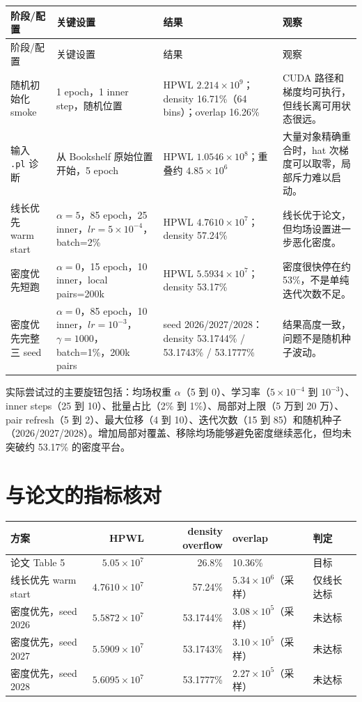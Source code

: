 \documentclass[11pt,a4paper]{ctexart}
\newcommand{\HPWL}{\textsc{HPWL}}
\begin{document}
\begin{longtable}{p{2.7cm}p{4.2cm}p{4.0cm}p{3.2cm}}
\toprule
阶段/配置 & 关键设置 & 结果 & 观察 \\
\midrule
\endfirsthead
\toprule
阶段/配置 & 关键设置 & 结果 & 观察 \\
\midrule
\endhead
随机初始化 smoke & 1 epoch，1 inner step，随机位置 & \HPWL{} $2.214\times10^9$；density 16.71\%（64 bins）；overlap 16.26\% & CUDA 路径和梯度均可执行，但线长离可用状态很远。\\
输入 \texttt{.pl} 诊断 & 从 Bookshelf 原始位置开始，5 epoch & \HPWL{} $1.0546\times10^8$；重叠约 $4.85\times10^6$ & 大量对象精确重合时，hat 次梯度可以取零，局部斥力难以启动。\\
线长优先 warm start & $\alpha=5$，85 epoch，25 inner，$lr=5\times10^{-4}$，batch=2\% & \HPWL{} $4.7610\times10^7$；density 57.24\% & 线长优于论文，但均场设置进一步恶化密度。\\
密度优先短跑 & $\alpha=0$，15 epoch，10 inner，local pairs=200k & \HPWL{} $5.5934\times10^7$；density 53.17\% & 密度很快停在约 53\%，不是单纯迭代次数不足。\\
密度优先完整三 seed & $\alpha=0$，85 epoch，10 inner，$lr=10^{-3}$，$\gamma=1000$，batch=1\%，200k pairs & seed 2026/2027/2028：density 53.1744\% / 53.1743\% / 53.1777\% & 结果高度一致，问题不是随机种子波动。\\
\bottomrule
\end{longtable}

实际尝试过的主要旋钮包括：均场权重 $\alpha$（5 到 0）、学习率（$5\times10^{-4}$ 到 $10^{-3}$）、inner steps（25 到 10）、批量占比（2\% 到 1\%）、局部对上限（5 万到 20 万）、pair refresh（5 到 2）、最大位移（4 到 10）、迭代次数（15 到 85）和随机种子（2026/2027/2028）。增加局部对覆盖、移除均场能够避免密度继续恶化，但均未突破约 53.17\% 的密度平台。

\section{与论文的指标核对}

\begin{center}
\begin{tabular}{p{3.6cm}r r p{3.5cm}p{2.1cm}}
\toprule
方案 & \HPWL{} & density overflow & overlap & 判定 \\
\midrule
论文 Table 5 & $5.05\times10^7$ & 26.8\% & 10.36\% & 目标 \\
线长优先 warm start & $4.7610\times10^7$ & 57.24\% & $5.34\times10^6$（采样） & 仅线长达标 \\
密度优先，seed 2026 & $5.5872\times10^7$ & 53.1744\% & $3.08\times10^5$（采样） & 未达标 \\
密度优先，seed 2027 & $5.5909\times10^7$ & 53.1743\% & $3.10\times10^5$（采样） & 未达标 \\
密度优先，seed 2028 & $5.6095\times10^7$ & 53.1777\% & $2.27\times10^5$（采样） & 未达标 \\
\bottomrule
\end{tabular}
\end{center}
\end{document}
